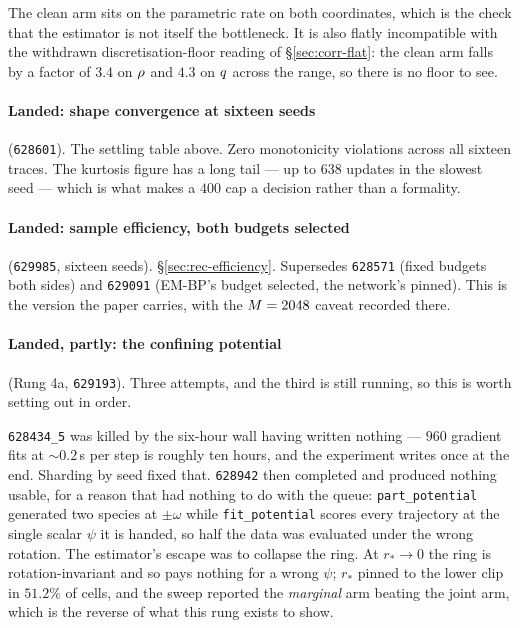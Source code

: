 \noindent
The clean arm sits on the parametric rate on both coordinates, which is the check that the
estimator is not itself the bottleneck. It is also flatly incompatible with the withdrawn
discretisation-floor reading of \S\ref{sec:corr-flat}: the clean arm falls by a factor of $3.4$ on
$\rho$ and $4.3$ on $q$ across the range, so there is no floor to see.

\paragraph{Landed: shape convergence at sixteen seeds} (\texttt{628601}). The settling table above.
Zero monotonicity violations across all sixteen traces. The kurtosis figure has a long tail --- up
to $638$ updates in the slowest seed --- which is what makes a $400$ cap a decision rather than a
formality.

\paragraph{Landed: sample efficiency, both budgets selected} (\texttt{629985}, sixteen seeds).
\S\ref{sec:rec-efficiency}. Supersedes \texttt{628571} (fixed budgets both sides) and
\texttt{629091} (EM-BP's budget selected, the network's pinned). This is the version the paper
carries, with the $M=2048$ caveat recorded there.

\paragraph{Landed, partly: the confining potential} (Rung 4a, \texttt{629193}).
\label{sec:rung4a-status}
Three attempts, and the third is still running, so this is worth setting out in order.

\texttt{628434\_5} was killed by the six-hour wall having written nothing --- $960$ gradient fits at
${\sim}0.2$\,s per step is roughly ten hours, and the experiment writes once at the end. Sharding by
seed fixed that. \texttt{628942} then completed and produced nothing usable, for a reason that had
nothing to do with the queue: \texttt{part\_potential} generated two species at $\pm\omega$ while
\texttt{fit\_potential} scores every trajectory at the single scalar $\psi$ it is handed, so half the
data was evaluated under the wrong rotation. The estimator's escape was to collapse the ring. At
$r_*\to0$ the ring is rotation-invariant and so pays nothing for a wrong $\psi$; $r_*$ pinned to the
lower clip in $51.2\%$ of cells, and the sweep reported the \emph{marginal} arm beating the joint
arm, which is the reverse of what this rung exists to show.

